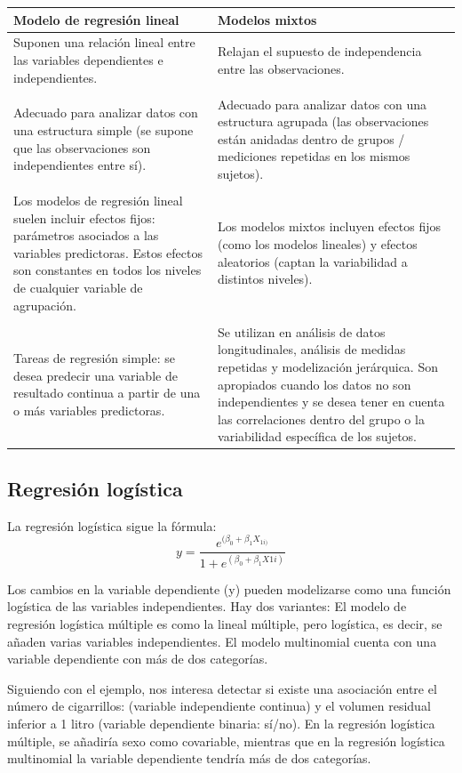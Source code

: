 \begin{table}[htbp]
\centering
\begin{tabular}{p{7cm}|p{7cm}}
Modelo de regresión lineal & Modelos mixtos \\ \hline
Suponen una relación lineal entre las variables dependientes e independientes. & Relajan el supuesto de independencia entre las observaciones. \\
\\
Adecuado para analizar datos con una estructura simple (se supone que las observaciones son independientes entre sí). & Adecuado para analizar datos con una estructura agrupada (las observaciones están anidadas dentro de grupos / mediciones repetidas en los mismos sujetos). \\
\\
Los modelos de regresión lineal suelen incluir efectos fijos: parámetros asociados a las variables predictoras. Estos efectos son constantes en todos los niveles de cualquier variable de agrupación. & Los modelos mixtos incluyen efectos fijos (como los modelos lineales) y efectos aleatorios (captan la variabilidad a distintos niveles).\\
\\
Tareas de regresión simple: se desea predecir una variable de resultado continua a partir de una o más variables predictoras. & Se utilizan en análisis de datos longitudinales, análisis de medidas repetidas y modelización jerárquica. Son apropiados cuando los datos no son independientes y se desea tener en cuenta las correlaciones dentro del grupo o la variabilidad específica de los sujetos.
\end{tabular}
\end{table}

\subsection{Regresión logística}
La regresión logística sigue la fórmula:
$$y = \frac{e^{(\beta_0 + \beta_1X_{1i)}}}{1 + e^{(\beta_0 + \beta_1X{1i})}}$$

Los cambios en la variable dependiente (y) pueden modelizarse como una función logística de las variables independientes. Hay dos variantes:
El modelo de regresión logística múltiple es como la lineal múltiple, pero logística, es decir, se añaden varias variables independientes. El modelo multinomial cuenta con una variable dependiente con más de dos categorías.

Siguiendo con el ejemplo, nos interesa detectar si existe una asociación entre el número de cigarrillos: (variable independiente continua) y el volumen residual inferior a 1 litro (variable dependiente binaria: sí/no). En la regresión logística múltiple, se añadiría sexo como covariable, mientras que en la regresión logística multinomial la variable dependiente tendría más de dos categorías.

